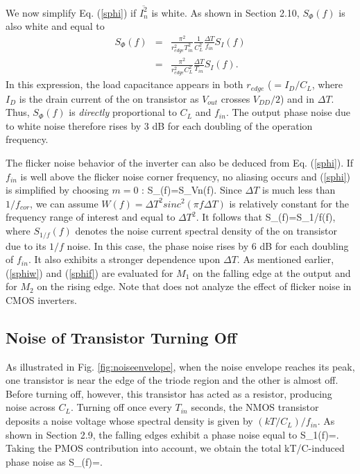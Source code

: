 We now simplify Eq. (\ref{sphi}) if $\overline{I_n^2}$ is white. As shown in Section 2.10, $S_{\Phi}(f)$ is also white and equal to 
\begin{eqnarray}
S_{\Phi}(f)&=&\frac{\pi^2}{r_{edge}^2 T_{in}^2}\frac{1}{C_L^2}\frac{\Delta T}{f_{in}}S_I(f) \nonumber \\ &=&\frac{\pi^2}{r_{edge}^2 C_L^2} \frac{\Delta T}{T_{in}} S_I(f).
\label{sphiw}
\end{eqnarray}
In this expression, the load capacitance appears in both $r_{edge}$ ($=I_D/C_L$, where $I_D$ is the drain current of the on transistor as $V_{out}$
crosses $V_{DD}/2$) and in $\Delta T$. Thus, $S_{\Phi}(f)$ is {\em directly} proportional to $C_L$ and $f_{in}$. The output phase noise due to white
noise therefore rises by 3 dB for each doubling of the operation frequency.

The flicker noise behavior of the inverter can also be deduced from Eq. (\ref{sphi}). If $f_{in}$ is well above the flicker noise corner
frequency, no aliasing occurs and (\ref{sphi}) is simplified by choosing $m=0$ :
\beq
S_{\Phi}(f)=S_{Vn}(f).
\label{sphina}
\eeq
Since $\Delta T$ is much less than $1/f_{cor}$, we can assume $W(f)={\Delta T}^2 {sinc}^2(\pi f \Delta T)$ is relatively constant for the frequency
range of interest and equal to ${\Delta T}^2$. It follows that
\beq
S_{\Phi}(f)=S_{1/f}(f),
\label{sphif}
\eeq
where $S_{1/f}(f)$ denotes the noise current spectral density of the on transistor due to its $1/f$ noise. In this case, the phase noise rises by 6
dB for each doubling of $f_{in}$. It also exhibits a stronger dependence upon $\Delta T$. As mentioned earlier, (\ref{sphiw}) and (\ref{sphif}) are
evaluated for $M_1$ on the falling edge at the output and for $M_2$ on the rising edge.
Note that \cite{Abidi} does not analyze the effect of flicker noise in CMOS inverters.

\subsection{Noise of Transistor Turning Off}
As illustrated in Fig. \ref{fig:noiseenvelope}, when the noise envelope reaches its peak, one transistor is near the edge of the triode region and the other is almost
off. Before turning off, however, this transistor has acted as a resistor, producing noise across $C_L$. {Turning off once every $T_{in}$ seconds,
the NMOS transistor deposits a noise voltage whose spectral density is given by $(kT/C_L)/f_{in}$. As
shown in Section 2.9, the falling edges
exhibit a phase noise equal to 
\beq
S_{1}(f)=.
\label{sphi1}
\eeq
Taking the PMOS contribution into account, we obtain the total kT/C-induced phase noise as
\beq
S_{\Phi}(f)=.
\label{sphioff}
\eeq
}

